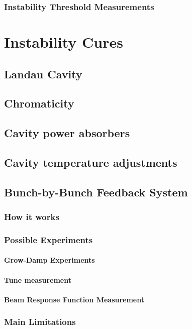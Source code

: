 \documentclass[
	12pt,				%
	openright,			%
	oneside,			%
	a4paper,		%
	chapter=TITLE,		%
	section=TITLE,		%
    brazil,				%
	english,			%
	sumario=tradicional,
	]{abntex2}
\begin{document}
      \subsubsection{Instability Threshold Measurements}
  \section{Instability Cures}
    \subsection{Landau Cavity}
    \subsection{Chromaticity}
    \subsection{Cavity power absorbers}
    \subsection{Cavity temperature adjustments}
    \subsection{Bunch-by-Bunch Feedback System}
      \subsubsection{How it works}
      \subsubsection{Possible Experiments}
        \paragraph{Grow-Damp Experiments}
        \paragraph{Tune measurement}
        \paragraph{Beam Response Function Measurement}
      \subsubsection{Main Limitations}
\end{document}
